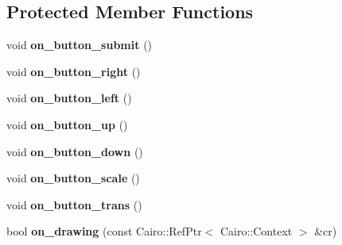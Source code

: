 \subsection*{Protected Member Functions}
\begin{DoxyCompactItemize}
\item 
void {\bfseries on\+\_\+button\+\_\+submit} ()\hypertarget{classInput2dWindow_a095560d237009fea12e3ee651d7248b0}{}\label{classInput2dWindow_a095560d237009fea12e3ee651d7248b0}

\item 
void {\bfseries on\+\_\+button\+\_\+right} ()\hypertarget{classInput2dWindow_a55a69ce46e14b78cf1128ef25e899d93}{}\label{classInput2dWindow_a55a69ce46e14b78cf1128ef25e899d93}

\item 
void {\bfseries on\+\_\+button\+\_\+left} ()\hypertarget{classInput2dWindow_af0aeb7d0835fa4dc40b5c1ae39a495cb}{}\label{classInput2dWindow_af0aeb7d0835fa4dc40b5c1ae39a495cb}

\item 
void {\bfseries on\+\_\+button\+\_\+up} ()\hypertarget{classInput2dWindow_addc97f47f563b169b345279e460bc6d2}{}\label{classInput2dWindow_addc97f47f563b169b345279e460bc6d2}

\item 
void {\bfseries on\+\_\+button\+\_\+down} ()\hypertarget{classInput2dWindow_a60067e0c752da08a68c1ecef26808430}{}\label{classInput2dWindow_a60067e0c752da08a68c1ecef26808430}

\item 
void {\bfseries on\+\_\+button\+\_\+scale} ()\hypertarget{classInput2dWindow_aaf48d03bb2c28cbb2fa78075cee1a93a}{}\label{classInput2dWindow_aaf48d03bb2c28cbb2fa78075cee1a93a}

\item 
void {\bfseries on\+\_\+button\+\_\+trans} ()\hypertarget{classInput2dWindow_ac3c44172a5b85102df686e3c7c6ea5fd}{}\label{classInput2dWindow_ac3c44172a5b85102df686e3c7c6ea5fd}

\item 
bool {\bfseries on\+\_\+drawing} (const Cairo\+::\+Ref\+Ptr$<$ Cairo\+::\+Context $>$ \&cr)\hypertarget{classInput2dWindow_aa09359898d16c504732738e509534d27}{}\label{classInput2dWindow_aa09359898d16c504732738e509534d27}

\end{DoxyCompactItemize}
